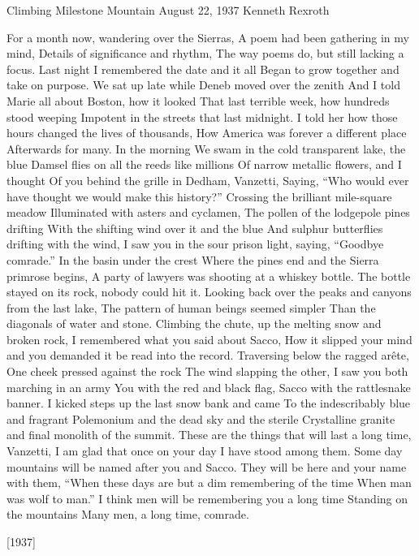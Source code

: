 \begin{poem}
    {Climbing Milestone Mountain 
    August 22, 1937}
        {Kenneth Rexroth}

    For a month now, wandering over the Sierras, 
    A poem had been gathering in my mind, 
    Details of significance and rhythm, 
    The way poems do, but still lacking a focus. 
    Last night I remembered the date and it all 
    Began to grow together and take on purpose. 
    \hfill       We sat up late while Deneb moved over the zenith 
    And I told Marie all about Boston, how it looked 
    That last terrible week, how hundreds stood weeping 
    Impotent in the streets that last midnight. 
    I told her how those hours changed the lives of thousands, 
    How America was forever a different place 
    Afterwards for many. 
    \hfill                                In the morning 
    We swam in the cold transparent lake, the blue 
    Damsel flies on all the reeds like millions 
    Of narrow metallic flowers, and I thought 
    Of you behind the grille in Dedham, Vanzetti, 
    Saying, ``Who would ever have thought we would make this history?'' 
    Crossing the brilliant mile-square meadow 
    Illuminated with asters and cyclamen, 
    The pollen of the lodgepole pines drifting 
    With the shifting wind over it and the blue 
    And sulphur butterflies drifting with the wind, 
    I saw you in the sour prison light, saying, 
    ``Goodbye comrade.'' 
    \hfill                                      In the basin under the crest 
    Where the pines end and the Sierra primrose begins, 
    A party of lawyers was shooting at a whiskey bottle. 
    The bottle stayed on its rock, nobody could hit it. 
    Looking back over the peaks and canyons from the last lake, 
    The pattern of human beings seemed simpler 
    Than the diagonals of water and stone. 
    Climbing the chute, up the melting snow and broken rock, 
    I remembered what you said about Sacco, 
    How it slipped your mind and you demanded it be read into the record. 
    Traversing below the ragged ar\^ete, 
    One cheek pressed against the rock 
    The wind slapping the other, 
    I saw you both marching in an army 
    You with the red and black flag, Sacco with the rattlesnake banner. 
    I kicked steps up the last snow bank and came 
    To the indescribably blue and fragrant 
    Polemonium and the dead sky and the sterile 
    Crystalline granite and final monolith of the summit. 
    These are the things that will last a long time, Vanzetti, 
    I am glad that once on your day I have stood among them. 
    Some day mountains will be named after you and Sacco. 
    They will be here and your name with them, 
    ``When these days are but a dim remembering of the time 
    When man was wolf to man.'' 
    I think men will be remembering you a long time 
    Standing on the mountains 
    Many men, a long time, comrade. 

\hfill [1937] 
\end{poem}

